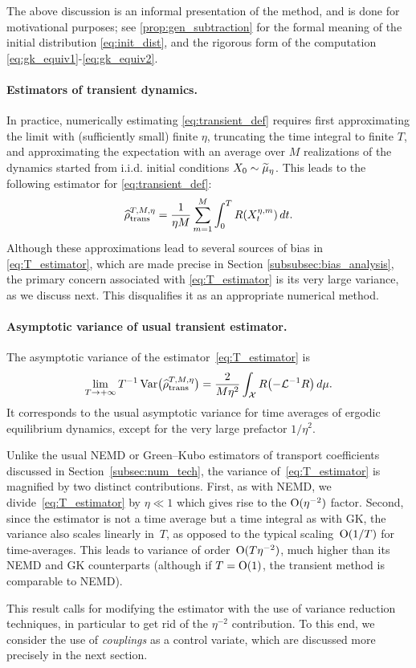 The above discussion is an informal presentation of the method, and is done for motivational purposes; see \cref{prop:gen_subtraction} for the formal meaning of the initial distribution \eqref{eq:init_dist}, and the rigorous form of the computation \eqref{eq:gk_equiv1}-\eqref{eq:gk_equiv2}.  


\paragraph{Estimators of transient dynamics.} In practice, numerically estimating \eqref{eq:transient_def} requires first approximating the limit with (sufficiently small) finite $\eta$, truncating the time integral to finite $T$, and approximating the expectation with an average over $M$ realizations of the dynamics started from i.i.d. initial conditions $X_0\sim\widetilde{\mu}_\eta$. This leads to the following estimator for \eqref{eq:transient_def}:
%
\begin{equation}
	\widehat{\rho}^{T,M,\eta}_{\rm trans} = \frac{1}{\eta M}\sum_{m=1}^M \int_0^T R(X_t^{\eta,m}) \, dt.	
	\label{eq:T_estimator}
\end{equation}
%
Although these approximations lead to several sources of bias in \eqref{eq:T_estimator}, which are made precise in Section \ref{subsubsec:bias_analysis}, the primary concern associated with \eqref{eq:T_estimator} is its very large variance, as we discuss next. This disqualifies it as an appropriate numerical method.

\paragraph{Asymptotic variance of usual transient estimator.} The asymptotic variance of the estimator~\eqref{eq:T_estimator} is
%
\begin{equation}
	\lim_{T\to+\infty} T^{-1}\Var\bigl(\Test\bigr) = \frac{2}{M\eta^2}\int_\mathcal{X} R\paren*{-\L^{-1} R} \, d\mu.
	\label{eq:asym_var_transient}
\end{equation}
%
It corresponds to the usual asymptotic variance for time averages of ergodic equilibrium dynamics, except for the very large prefactor $1/\eta^2$. 

Unlike the usual NEMD or Green--Kubo estimators of transport coefficients discussed in Section~\ref{subsec:num_tech}, the variance of~\eqref{eq:T_estimator} is magnified by two distinct contributions. First, as with NEMD, we divide~\eqref{eq:T_estimator} by $\eta\ll 1$ which gives rise to the $\mathrm{O}(\eta^{-2})$ factor. Second, since the estimator is not a time average but a time integral as with GK, the variance also scales linearly in~$T$, as opposed to the typical scaling~$\mathrm{O}(1/T)$ for time-averages. This leads to variance of order~$\mathrm{O}(T\eta^{-2})$, much higher than its NEMD and GK counterparts (although if $T=\mathrm{O}(1)$, the transient method is comparable to NEMD).

This result calls for modifying the estimator with the use of variance reduction techniques, in particular to get rid of the $\eta^{-2}$ contribution. To this end, we consider the use of \emph{couplings} as a control variate, which are discussed more precisely in the next section.
%







